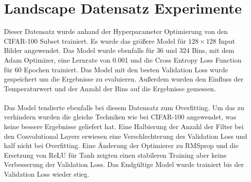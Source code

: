\section{Landscape Datensatz Experimente}
Dieser Datensatz wurde anhand der Hyperparameter Optimierung von den CIFAR-100 Subset trainiert. Es wurde das größere Model für $128 \times 128$
Input Bilder angewendet. Das Model wurde ebenfalls für 36 und 324 Bins, mit dem Adam Optimizer, eine Lernrate von 0.001 und die Cross Entropy 
Loss Function für 60 Epochen trainiert. Das Model mit den besten Validation Loss wurde gespeichert um die Ergebnisse zu evaluieren. Außerdem
wurden den Einfluss der Temperaturwert und der Anzahl der Bins auf die Ergebnisse gemessen.
\\
\\
Das Model tendierte ebenfalls bei diesem Datensatz zum Overfitting. Um das zu verhindern wurden die gleiche Techniken wie bei CIFAR-100
angewendet, was keine bessere Ergebnisse geliefert hat. Eine Halbierung der Anzahl der Filter bei den Convolutional Layers erwiesen eine Verschlechterung
des Validation Loss und half nicht bei Overfitting. Eine Änderung der Optimierer zu RMSprop und die Ersetzung von ReLU für Tanh zeigten
einen stabileren Training aber keine Verbesserung der Validation Loss. Das Endgültige Model wurde trainiert bis der Validation Loss wieder stieg.

